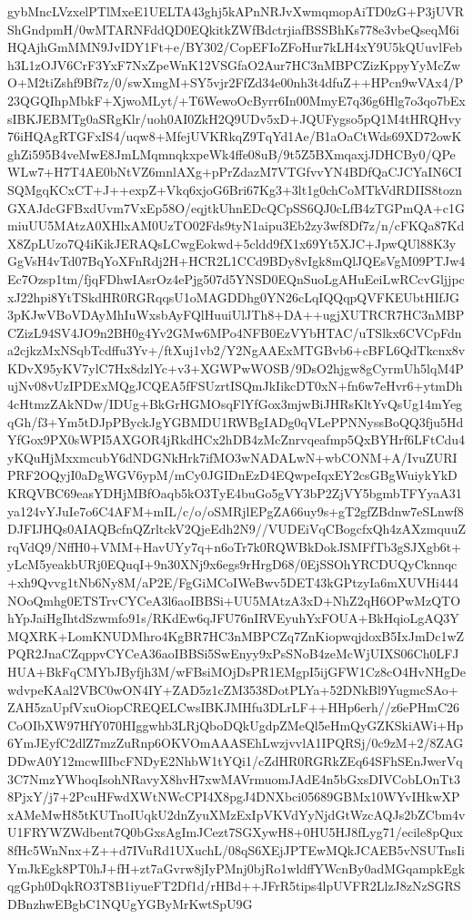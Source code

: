 {{{{gybMncLVzxelPTlMxeE1UELTA43ghj5kAPnNRJvXwmqmopAiTD0zG+P3jUVRShGndpmH/\niP0wMTARNFddQD0EQkitkZWfBdctrjiafBSSBhKs778e3vbeQseqM6iHQAjhGmMMN9JvIDY1Ft+e\n/BY302/CopEFIoZFoHur7kLH4xY9U5kQUuvlFebh3L1zOJV6CrF3YxF7NxZpeWnK12VSGfaO2Aur\nJlYCpqybqIegBR7HC3nMBPCZizKppyYyMcZwO+M2tiZshf9Bf7z/0/swXmgM+SY5vjr2FfZd34e0\nvDRIG0nh3t4dfuZ++HPcn9wVAx4/P23QGQIhpMbkF+XjwoMLyt/+T6WewoOcByrr6In00MmyE7q3\n6g6Hlg7o3qo7bExsIBKJEBMTg0aSRgKlr/uoh0AI0ZkH2Q9UDv5xD+JQUFygso5pQ1M4tHRQHvy7\ntOiCxpLGAiWuO6iHQAgRTGFxIS4/uqw8+MfejUVKRkqZ9TqYd1Ae/B1aOaCtWds69XD72owKghZi\nYv595B4veMwE8JmLMqmnqkxpeWk4ffe08uB/9t5Z5BXmqaxjJDHCBy0/QPeWLw7+H7T4AE0bNtVZ\nJqHwmktTVBAIIVUqYSVIepyEU6mnlAXg+pPrZdazM7VTGfvvYN4BDfQaCJCYaIN6CISQMgqKCxCT+J++expZ+Vkq6xjoG6Bri67Kg3+3lt1g0chCoMTkVdRDIIS8toznGXAJdcGFBxdUvm7VxEp5\n8O/eqjtkUhnEDcQCpSS6QJ0cLfB4zTGPmQA+c1GmiuUU5MAtzA0XHlxAM0UzTO02Fds9tyN1aipu\nf3Eb2zy3wf8Df7z/n/cFKQa87KdX8ZpLUzo7Q4iKikJERAQsLCwgEokwd+5cldd9fX1x69Yt5XJC\nQgIuXLgAKyu+JpwQUl88K3yGgVsH4vTd07BqYoXFnRdj2H+HCR2L1CCd9BDy8vIgk8mQlJQEsVgM\nT09PTJw4Ec7Ozsp1tm/fjqFDhwIAsrOz4ePjg507d5YNSD0EQnSuoLgAHuEeiLwRCcvGljjpcxJ2\npnZCxyKvgZvnIcTGxsLa2hpi8YtTSkdHR0RGRqqsU1oMAGDDhg0YN26cLqIQQqpQVFKEUbtHIfJG\nJMwamiFqdBQVg3pKJwVBoVDAyMhIuWxsbAyFQlHuuiUlJTh8+DA++ugjXUTRCR7HC3nMBPCZizL9\nq4SV4JO9n2BH0g4Yv2GMw6MPo4NFB0EzVYbHTAC/uTSlkx6CVCpFdna2cjkzMxNSqbTcdffu3Yv+\n/ftXuj1vb2/Y2NgAAExMTGBvb6+cBFL6QdTkcnx8vKDvX95yKV7ylC7Hx8dzlYc+v3+XGWPwWOSB/9DsO2hjgw8gCyrmUh5lqM4PujNv08vUzIPDExMQgJCQEA5fFSUzrtISQmJkIikcDT0xN+fn6w\nt7eHvr6+ytmDh4cHtmzZAkNDw/IDUg+BkGrHGMOsqFlYfGox3mjwBiJHRsKltYvQsUg14mYegqGh\nIdauXQt/f3+Ym5tDJpPByckJgYGBMDU1RWBgIADg0qVLePPNNyssBoQQ3fju5HdYfGox9PX0sWPI\nDioG5AXGOR4jRkdHCx2hDB4zMcZnrvqeafmp5QxBYHrf6LFtCdu4yKQuHjMxxmcubY6dNDGNkHrk\np7ifMO3wNADALwN+wbCONM+A/IvuZURIPRF2OQyjI0aDgWGV6ypM/mCy0JGIDnEzD4EQwpeIqxEY\nu2csGBgWuiykYkDKRQVBC69easYDHjMBfOaqb5kO3TyE4buGo5gVY3bP2ZjVY5bgmbTFYyaA31ya\nooJASB124vYJuIe7o6C4AFM+mIL/c/o/oSMRjlEPgZA66uy9s+gT2gfZBdnw7eSLnwf8DJFIJHQs\nUkOoh0AIAQBcfnQZrltckV2QjeEdh2N9//VUDEiVqCBogcfxQh4zAXzmquuZrqVdQ9/NffH0+VMM\nbDcQoR+HavUYy7q+n6oTr7k0RQWBkDokJSMFfTb3gSJXgb6t+yLcM5yeakbURj0EQuqI+9n30XNj\nT9x6egs9rHrgD68/0EjSSOhYRCDUQyCknnqc+xh9Qvvg1tNb6Ny8M/aP2E/FgGiMCoIWeBwv5DET\nwGeuupYp43kGPtzyIa6mXUVHi444NOoQmhg0ETSTrvCYCeA3l6aoIBBSi+UU5MAtzA3xD+NhZ2qH\nI6OPwMzQTOhYpJaiHgIhtdSzwmfo91s/RKdEw6qJFU76nIRVEyuhYxFOUA+BkHqioLgAQ3YMQXRK\nNCwbW+LomKNUDMhro4KgBR7HC3nMBPCZq7ZnKiopwqjdoxB5IxJmDc1wZPQR2JnaCZqppvCYCeA3\nl6aoIBBSi5SwEnyy9xPsSNoB4zeMcWjUIXS06Ch0LFJHUA+BkFqCMYbJByfjh3M/wFBsiMOjDsPR\nylHoWIRT1EMgpI5ijGFW1Cz8cO4HvNHgDewdvpeKAal2VBC0wON4IY+ZAD5z1cZM3538DotPLYa+\nnj52DNkBl9YugmcSAo+ZAH5zaUpfVxuOiopCREQELCwsIBKJMHfu3DLrLF++HHp6erh//z6ePHmC\nDRs26CoOIbXW97HfY070HIggwhb3LRjQboDQkUgdpZMeQl5eHmQyGZKSkiAWi+Hp6YmJEyfC2dlZ\nuc7mzZuRnp6OKVOmAAASEhLwzjvvlA1IPQRSj/0c9zM+2/8ZAGDDwA0Y12mcwIlIbcFNDyE2NhbW\n1tYQi1/cZdHR0RGRkZEq64SFhSEnJwerVq3C7NmzYWhoqIsohNRavyX8hvH7xwMAVrmuomJAdE4n\nBUGhUMDIyEi5bGxsDIVCobLOnTt38PjxY/j7+2PcuHFwdXWtNWcCPI4X8pgJ4DNXbci05689GBMx\nBgwMC10WYvIHkwXPxAMeMwH85tKUTnoIUqkU2dnZyuXMzExIpVKVdYyNjdGtWzcAQJs2bZCbm4vU\n1FRYWZWdbent7Q0bGxsAgImJCezt7SGXywH8+0HU5HJ8fLyg71/ecile8pQux8fHc5WnNnx+Z++d\nxZzkOShmxfBq7IVuRd1UXuchL/08qS6XEjJPTEwMQkJCAEB5vNSUTnsIiYmJkEgk8PT0hJ+fH+zt\n7aGvrw8jIyPMnj0bjRo1wldffYWcnBy0adMGqampkEgkqgGph0DqkRO3T8B1iyueFT2Df1d/rHBd\nQY++JFrR5tips4lpUVFR2LlzJ8zNzSGRSDBnzhwEBgbC1NQUgYGByMrKwtSpU9G}}}}
